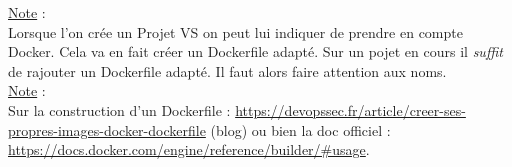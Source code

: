 \documentclass[a4paper,12pt,twoside]{article}
\newcommand{\note}[1]{\noindent\underline{Note} : \\ \indent #1}
\begin{document}
\note{Lorsque l'on crée un Projet VS on peut lui indiquer de prendre en compte Docker. Cela va en fait créer un Dockerfile adapté. Sur un pojet en cours il \textit{suffit} de rajouter un Dockerfile adapté. Il faut alors faire attention aux noms.}\\

\note{Sur la construction d'un Dockerfile : \url{https://devopssec.fr/article/creer-ses-propres-images-docker-dockerfile} (blog) ou bien la doc officiel : \url{https://docs.docker.com/engine/reference/builder/\#usage}.}\\



\end{document}
